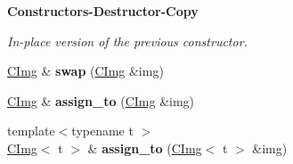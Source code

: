 \begin{Indent}{\bf Constructors-\/\-Destructor-\/\-Copy}
\begin{DoxyCompactItemize}
\begin{DoxyCompactList}\small\item\em In-\/place version of the previous constructor. \end{DoxyCompactList}\item 
\hypertarget{structcimg__library_1_1_c_img_aba06f9da71067abe486157c00176d860}{\hyperlink{structcimg__library_1_1_c_img}{C\-Img} \& {\bfseries swap} (\hyperlink{structcimg__library_1_1_c_img}{C\-Img} \&img)}\label{structcimg__library_1_1_c_img_aba06f9da71067abe486157c00176d860}

\item 
\hypertarget{structcimg__library_1_1_c_img_a6cee08ede6d8f97dae41897aabf3ebd4}{\hyperlink{structcimg__library_1_1_c_img}{C\-Img} \& {\bfseries assign\-\_\-to} (\hyperlink{structcimg__library_1_1_c_img}{C\-Img} \&img)}\label{structcimg__library_1_1_c_img_a6cee08ede6d8f97dae41897aabf3ebd4}

\item 
\hypertarget{structcimg__library_1_1_c_img_ae779169256fb99a54c539fd1496a74a8}{{\footnotesize template$<$typename t $>$ }\\\hyperlink{structcimg__library_1_1_c_img}{C\-Img}$<$ t $>$ \& {\bfseries assign\-\_\-to} (\hyperlink{structcimg__library_1_1_c_img}{C\-Img}$<$ t $>$ \&img)}\label{structcimg__library_1_1_c_img_ae779169256fb99a54c539fd1496a74a8}

\end{DoxyCompactItemize}
\end{Indent}
